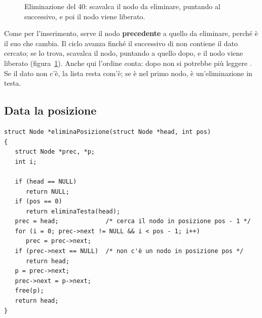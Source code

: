 \begin{figure}[H]
  \centering
  \caption{Eliminazione del 40:  scavalca il nodo da eliminare,
           puntando al successivo, e poi il nodo viene liberato.}
  \label{fig:el-valore}
\end{figure}

Come per l'inserimento, serve il nodo \textbf{precedente} a quello da
eliminare, perché è il suo  che cambia. Il ciclo avanza finché il
successivo di  non contiene il dato cercato; se lo trova,
  scavalca il nodo, puntando a quello dopo, e
 il nodo viene liberato (figura~\ref{fig:el-valore}). Anche
qui l'ordine conta: dopo  non si potrebbe più leggere
. Se il dato non c'è, la lista resta com'è; se è nel primo
nodo, è un'eliminazione in testa.

\subsection{Data la posizione}

\begin{lstlisting}[style=c, name=lista.c]
struct Node *eliminaPosizione(struct Node *head, int pos)
{
   struct Node *prec, *p;
   int i;

   if (head == NULL)
      return NULL;
   if (pos == 0)
      return eliminaTesta(head);
   prec = head;             /* cerca il nodo in posizione pos - 1 */
   for (i = 0; prec->next != NULL && i < pos - 1; i++)
      prec = prec->next;
   if (prec->next == NULL)  /* non c'è un nodo in posizione pos */
      return head;
   p = prec->next;
   prec->next = p->next;
   free(p);
   return head;
}
\end{lstlisting}


